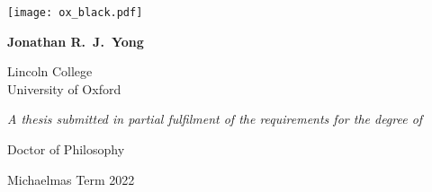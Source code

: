 \hspace{0pt}
\vfill
\begin{center}
    \Huge
    \textbf{\thesistitle}

    \vspace{1.0cm}

    \texttt{[image: ox\_black.pdf]}

    \vspace{0.6cm}

    \LARGE
    \textbf{Jonathan R.\ J.\ Yong}

    \vspace{0.4cm}

    \Large
    Lincoln College \\ University of Oxford

    \vspace{1.0cm}

    \large
    \textit{A thesis submitted in partial fulfilment of the requirements for the degree of}

    \Large
    Doctor of Philosophy
    
    Michaelmas Term 2022
\end{center}
\thispagestyle{empty}
\vfill
\hspace{0pt}
\newpage
